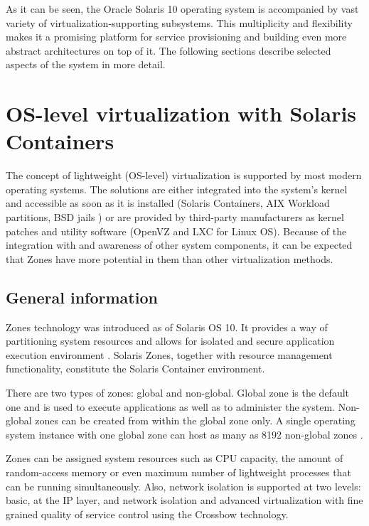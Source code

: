 \documentclass[11pt]{book}
\begin{document}
      As it can be seen, the Oracle Solaris 10 operating system is accompanied by vast variety
      of virtualization-supporting subsystems. This multiplicity and flexibility makes it a promising
      platform for service provisioning and building even more abstract architectures on top of it. The following
      sections describe selected aspects of the system in more detail.


    \section{OS-level virtualization with Solaris Containers}
    \label{sec:sol:containers}


      The concept of lightweight (OS-level) virtualization is supported by most modern operating systems. The solutions
      are either integrated into the system's kernel and accessible as soon as it is installed (Solaris Containers, AIX
      Workload partitions, BSD jails \cite{kamp}) or are provided by third-party manufacturers as kernel patches and
      utility software (OpenVZ and LXC for Linux OS). Because of the integration with and awareness of other system
      components, it can be expected that Zones have more potential in them than other virtualization methods.


      \subsection{General information}
      \label{sub:}

        Zones technology was introduced as of Solaris OS 10. It provides a way of partitioning system resources and
        allows for isolated and secure application execution environment \cite{sag}. Solaris Zones, together with
        resource management functionality, constitute the Solaris Container environment.

        There are two types of zones: global and non-global. Global zone is the default one and is used to execute
        applications as well as to administer the system. Non-global zones can be created from within the global zone
        only. A single operating system instance with one global zone can host as many as 8192 non-global zones
        \cite{sag}.

        Zones can be assigned system resources such as CPU capacity, the amount of random-access memory or even maximum
        number of lightweight processes that can be running simultaneously. Also, network isolation is supported at two
        levels: basic, at the IP layer, and network isolation and advanced virtualization with fine grained quality of
        service control using the Crossbow technology.
\end{document}
